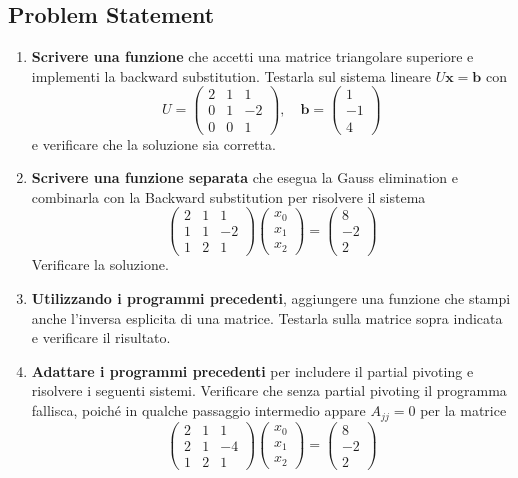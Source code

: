 \documentclass[11pt, a4paper]{article}
\begin{document}
\subsection{Problem Statement}
\begin{enumerate}
    \item \textbf{Scrivere una funzione} che accetti una matrice triangolare superiore e implementi la backward substitution. Testarla sul sistema lineare $U\mathbf{x} = \mathbf{b}$ con
    \[
        U = \begin{pmatrix} 2 & 1 & 1 \\ 0 & 1 & -2 \\ 0 & 0 & 1 \end{pmatrix}, \quad \mathbf{b} = \begin{pmatrix} 1 \\ -1 \\ 4 \end{pmatrix}
    \]
    e verificare che la soluzione sia corretta.

    \item \textbf{Scrivere una funzione separata} che esegua la Gauss elimination e combinarla con la Backward substitution per risolvere il sistema
    \[
        \begin{pmatrix} 2 & 1 & 1 \\ 1 & 1 & -2 \\ 1 & 2 & 1 \end{pmatrix} \begin{pmatrix} x_0 \\ x_1 \\ x_2 \end{pmatrix} = \begin{pmatrix} 8 \\ -2 \\ 2 \end{pmatrix}
    \]
    Verificare la soluzione. 

    \item \textbf{Utilizzando i programmi precedenti}, aggiungere una funzione che stampi anche l'inversa esplicita di una matrice. Testarla sulla matrice sopra indicata e verificare il risultato.

    \item \textbf{Adattare i programmi precedenti} per includere il partial pivoting e risolvere i seguenti sistemi. Verificare che senza partial pivoting il programma fallisca, poiché in qualche passaggio intermedio appare $A_{jj} = 0$ per la matrice
    \[
        \begin{pmatrix} 2 & 1 & 1 \\ 2 & 1 & -4 \\ 1 & 2 & 1 \end{pmatrix} \begin{pmatrix} x_0 \\ x_1 \\ x_2 \end{pmatrix} = \begin{pmatrix} 8 \\ -2 \\ 2 \end{pmatrix}
    \]


\end{enumerate}
\end{document}
